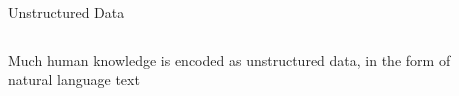 \documentclass[10pt]{beamer}
\begin{document}
\begin{frame}{Unstructured Data}
\begin{columns}
\begin{column}{0.5\textwidth}
Much human knowledge is encoded as \alert{unstructured data}, in the form of natural language text
\end{column}
\begin{column}{0.5\textwidth}
\begin{center}
\end{center}
\end{column}
\end{columns}
\end{frame}
\end{document}

